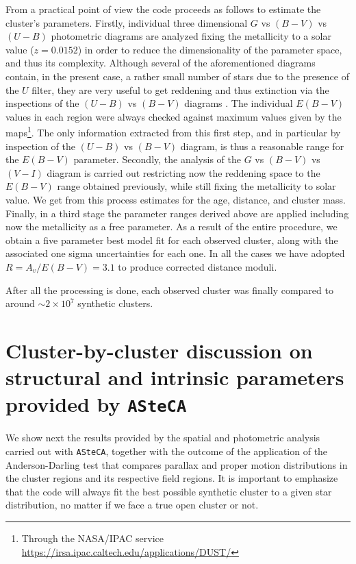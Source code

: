 \documentclass[draft]{aa}
\begin{document}
From a practical point of view the code proceeds as follows to estimate the
cluster's parameters. Firstly, individual three dimensional $G$ vs $(B-V)$ vs $
(U-B)$ photometric diagrams are analyzed fixing the metallicity to a solar
value ($z = 0.0152$) in order to reduce the dimensionality of the parameter
space, and thus its complexity. Although several of the aforementioned diagrams
contain, in the present case, a rather small number of stars due to the
presence of the $U$ filter, they are very useful to get reddening and thus
extinction via the inspections of the $(U-B)$ vs $(B-V)$ diagrams
\citep[e.g.,][]{Vazquez2008} .
The individual $E(B-V)$ values in each region were always checked against
maximum values given by the \cite{Schlafly_2011} maps\footnote{Through the
NASA/IPAC service \url{https://irsa.ipac.caltech.edu/applications/DUST/}}.
The only information extracted from this first step, and in particular
by inspection of the $(U-B)$ vs $(B-V)$ diagram, is thus a reasonable range for
the $E(B-V)$ parameter.
%
Secondly, the analysis of the $G$ vs $(B-V)$ vs $(V-I)$ diagram is carried out
restricting now the reddening space to the $E(B-V)$ range obtained previously,
while still fixing the metallicity to solar value. We get from this process
estimates for the age, distance, and cluster mass.
%
Finally, in a third stage the parameter ranges derived above are applied
including now the metallicity as a free parameter. As a result of the entire
procedure, we obtain a five parameter best model fit for each observed cluster,
along with the associated one sigma uncertainties for each one. In all the
cases we have adopted $R=A_v/E(B-V) = 3.1$ to produce corrected distance moduli.

After all the processing is done, each observed cluster was finally compared to
around $\sim2\times10^7$ synthetic clusters.



\section{Cluster-by-cluster discussion on structural and intrinsic parameters
provided by \texttt{ASteCA}}
\label{sec:cluster_discuss}

We show next the results provided by the spatial and photometric analysis
carried out with \texttt{ASteCA}, together with the outcome of the application
of the Anderson-Darling test that compares parallax and proper motion
distributions in the cluster regions and its respective field regions.
It is important to emphasize that the code will always fit the
best possible synthetic cluster to a given star distribution, no matter if we
face a true open cluster or not.
\end{document}
